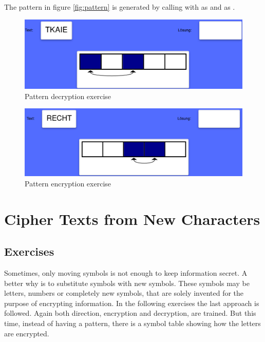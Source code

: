 \begin{example}
  The pattern in figure \ref{fig:pattern} is generated by calling  with  as  and \code{[[0, 4], [1, 2]]} as .
\end{example}

\begin{figure} 
    \centering
    \includegraphics[width=1.0 \columnwidth]{figures/pattern_decrypt.png}
    \caption{Pattern decryption exercise} 
    \label{fig:patternDecryption} 
\end{figure}

\begin{figure} 
    \centering
    \includegraphics[width=1.0 \columnwidth]{figures/pattern_encrypt.png}
    \caption{Pattern encryption exercise} 
    \label{fig:patternEncryption} 
\end{figure}

\section{Cipher Texts from New Characters}
\label{section:symbols}

\subsection{Exercises}
Sometimes, only moving symbols is not enough to keep information secret. A better why is to substitute symbols with new symbols. These symbols may be letters, numbers or completely new symbols, that are solely invented for the purpose of encrypting information.
In the following exercises the last approach is followed. Again both direction, encryption and decryption, are trained. But this time, instead of having a pattern, there is a symbol table showing how the letters are encrypted. 

